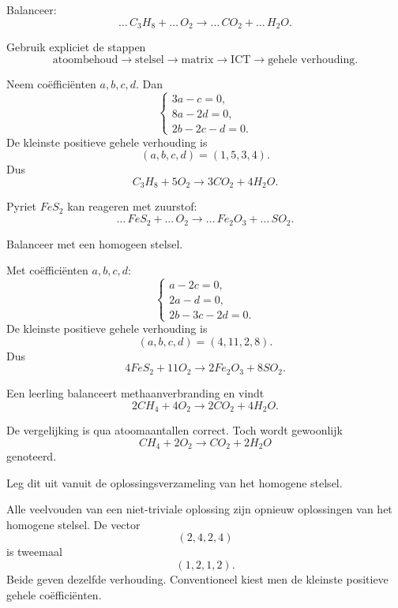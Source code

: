 \documentclass{ximera}
\begin{document}
\begin{oefening}{\oefB\ESS}

Balanceer:
\[
\ldots\,C_3H_8+\ldots\,O_2
\longrightarrow
\ldots\,CO_2+\ldots\,H_2O.
\]

Gebruik expliciet de stappen
\[
\text{atoombehoud}\to\text{stelsel}\to\text{matrix}\to\text{ICT}
\to\text{gehele verhouding}.
\]

\begin{oplossing}
Neem coëfficiënten \(a,b,c,d\). Dan
\[
\begin{cases}
3a-c=0,\\
8a-2d=0,\\
2b-2c-d=0.
\end{cases}
\]
De kleinste positieve gehele verhouding is
\[
(a,b,c,d)=(1,5,3,4).
\]
Dus
\[
\boxed{C_3H_8+5O_2\longrightarrow3CO_2+4H_2O}.
\]
\end{oplossing}
\end{oefening}


\begin{oefening}{\oefU}
Pyriet \(FeS_2\) kan reageren met zuurstof:
\[
\ldots\,FeS_2+\ldots\,O_2
\longrightarrow
\ldots\,Fe_2O_3+\ldots\,SO_2.
\]

Balanceer met een homogeen stelsel.

\begin{oplossing}
Met coëfficiënten \(a,b,c,d\):
\[
\begin{cases}
a-2c=0,\\
2a-d=0,\\
2b-3c-2d=0.
\end{cases}
\]
De kleinste positieve gehele verhouding is
\[
(a,b,c,d)=(4,11,2,8).
\]
Dus
\[
\boxed{4FeS_2+11O_2\longrightarrow2Fe_2O_3+8SO_2}.
\]
\end{oplossing}
\end{oefening}


\begin{oefening}{\oefU\ESS}

Een leerling balanceert methaanverbranding en vindt
\[
2CH_4+4O_2\longrightarrow2CO_2+4H_2O.
\]

De vergelijking is qua atoomaantallen correct. Toch wordt gewoonlijk
\[
CH_4+2O_2\longrightarrow CO_2+2H_2O
\]
genoteerd.

Leg dit uit vanuit de oplossingsverzameling van het homogene stelsel.

\begin{oplossing}
Alle veelvouden van een niet-triviale oplossing zijn opnieuw oplossingen
van het homogene stelsel. De vector
\[
(2,4,2,4)
\]
is tweemaal
\[
(1,2,1,2).
\]
Beide geven dezelfde verhouding. Conventioneel kiest men de kleinste
positieve gehele coëfficiënten.
\end{oplossing}
\end{oefening}
\end{document}
